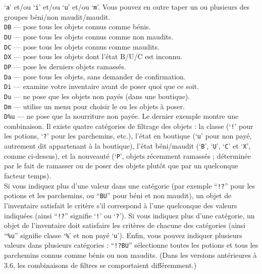 \documentclass[titlepage]{article}
\begin{document}
\begin{description}[font=\mdseries\ttfamily]
`\texttt{a}' et/ou `\texttt{i}' et/ou `\texttt{u}' et/ou `\texttt{m}'.
Vous pouvez en outre taper un ou plusieurs des
groupes béni/\-non maudit/\-maudit.\\
\texttt{DB}  --- pose tous les objets connus comme bénis.\\
\texttt{DU}  --- pose tous les objets connus comme non maudits.\\
\texttt{DC}  --- pose tous les objets connus comme maudits.\\
\texttt{DX}  --- pose tous les objets dont l'état B/U/C est inconnu.\\
\texttt{DP}  --- pose les derniers objets ramassés.\\
\texttt{Da}  --- pose tous les objets, sans demander de confirmation.\\
\texttt{Di}  --- examine votre inventaire avant de poser quoi que ce soit.\\
\texttt{Du}  --- ne pose que les objets non payés (dans une boutique).\\
\texttt{Dm}  --- utilise un menu pour choisir le ou les objets à poser.\\
\texttt{D\%u} --- ne pose que la nourriture non payée.
Le dernier exemple montre une combinaison.
Il existe quatre catégories de filtrage des objets : la classe (`\texttt{!}' pour
les potions, `\texttt{?}' pour les parchemins, etc.), l'état en boutique (`\texttt{u}'
pour non payé, autrement dit appartenant à la boutique), l'état béni/maudit
(`\texttt{B}', `\texttt{U}', `\texttt{C}' et `\texttt{X}', comme ci-dessus),
et la nouveauté (`\texttt{P}', objets récemment ramassés ; déterminée par le fait de
ramasser ou de poser des objets plutôt que par un quelconque facteur temps).
\\
Si vous indiquez plus d'une valeur dans une catégorie (par exemple ``\texttt{!?}'' pour
les potions et les parchemins, ou ``\texttt{BU}'' pour béni et non maudit), un objet
de l'inventaire satisfait le critère s'il correspond à l'une quelconque des
valeurs indiquées (ainsi ``\texttt{!?}'' signifie `\texttt{!}' ou `\texttt{?}').
Si vous indiquez plus d'une catégorie, un objet de l'inventaire doit satisfaire
les critères de chacune des catégories (ainsi ``\texttt{\%u}'' signifie classe `\texttt{\%}'
et non payé `\texttt{u}').
Enfin, vous pouvez indiquer plusieurs valeurs dans plusieurs catégories :
``\texttt{!?BU}'' sélectionne toutes les potions et tous les parchemins connus comme
bénis ou non maudits.
(Dans les versions antérieures à 3.6, les combinaisons de filtres se comportaient différemment.)

\end{description}
\end{document}

